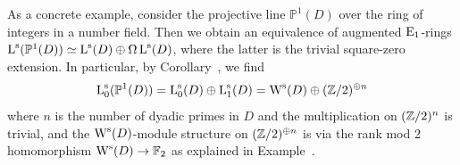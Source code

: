 \begin{example}
As a concrete example, consider the projective line $\mathbb{P}^1(D)$ over the ring of integers in a number field. Then we obtain an equivalence of augmented ${\mathrm{E}_{1}}$-rings $\operatorname L^{\mathrm{s}}(\mathbb{P}^1(D)) \simeq \operatorname L^{\mathrm{s}}(D) \oplus \Omega \operatorname L^{\mathrm{s}}(D)$, where the latter is the trivial square-zero extension. In particular, by Corollary~, we find 
\[
\operatorname L^{\mathrm{s}}_0(\mathbb{P}^1(D)) = \operatorname L^{\mathrm{s}}_0(D) \oplus \operatorname L^{\mathrm{s}}_1(D) = \operatorname W^{\mathrm{s}}(D) \oplus (\mathbb{Z}/2)^{\oplus n}
\]
where $n$ is the number of dyadic primes in $D$ and the multiplication on $(\mathbb{Z}/2)^n$ is trivial, and the $\operatorname W^{\mathrm{s}}(D)$-module structure on $(\mathbb{Z}/2)^{\oplus n}$ is via the rank mod 2 homomorphism $\operatorname W^{\mathrm{s}}(D) \to \mathbb{F}_2$ as explained in Example~.
\end{example}




